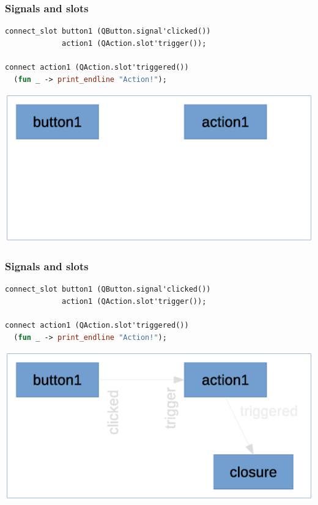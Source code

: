 \documentclass[serif,mathserif]{beamer}
\begin{document}
\begin{frame}[fragile]
  \frametitle{Signals and slots}

\begin{lstlisting}[language=Caml,morekeywords={module,sig,end,val}]
connect_slot button1 (QButton.signal'clicked())
             action1 (QAction.slot'trigger());

connect action1 (QAction.slot'triggered())
  (fun _ -> print_endline "Action!");
\end{lstlisting}

  \includegraphics[scale=0.5]{slot_graph_1}

\end{frame}


\begin{frame}[fragile]
  \frametitle{Signals and slots}

\begin{lstlisting}[language=Caml,morekeywords={module,sig,end,val}]
connect_slot button1 (QButton.signal'clicked())
             action1 (QAction.slot'trigger());

connect action1 (QAction.slot'triggered())
  (fun _ -> print_endline "Action!");
\end{lstlisting}

  \includegraphics[scale=0.5]{slot_graph_2}

\end{frame}
\end{document}
